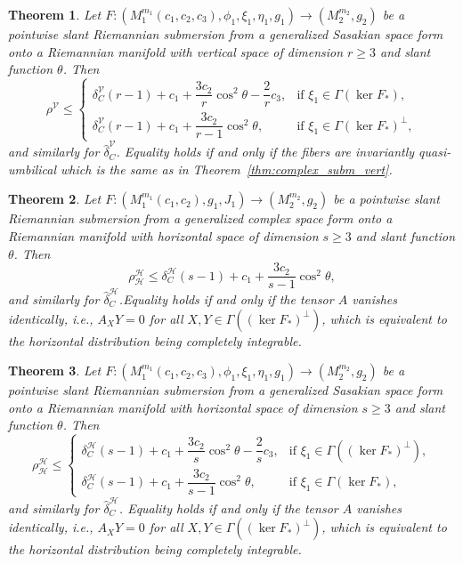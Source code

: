 \documentclass[10pt,a4paper]{amsart}
\newtheorem{theorem}{Theorem}
\newcommand{\calH}{\mathcal{H}}
\newcommand{\calV}{\mathcal{V}}
\begin{document}
\begin{theorem}\label{thm:sasakian_subm_vert}
Let $F:(M_1^{m_1}(c_1,c_2,c_3),\phi_1,\xi_1,\eta_1,g_1)\to (M_2^{m_2},g_2)$ be a pointwise slant Riemannian submersion from a generalized Sasakian space form onto a Riemannian manifold with vertical space of dimension $r\ge 3$ and slant function $\theta$. Then
\begin{equation}\label{eq:sasakian_subm_vert}
\rho^{\calV} \le \begin{cases}
\delta_C^{\calV}(r-1) + c_1 + \dfrac{3c_2}{r}\cos^2\theta - \dfrac{2}{r}c_3, & \text{if } \xi_1 \in \Gamma(\ker F_*),\\[6pt]
\delta_C^{\calV}(r-1) + c_1 + \dfrac{3c_2}{r-1}\cos^2\theta, & \text{if } \xi_1 \in \Gamma(\ker F_*)^\perp,
\end{cases}
\end{equation}
and similarly for $\hat{\delta}_C^{\calV}$. Equality holds if and only if the fibers are invariantly quasi-umbilical 
 which is the same as in 
Theorem~\ref{thm:complex_subm_vert}.
\end{theorem}

\begin{theorem}\label{thm:complex_subm_horiz}
Let $F:(M_1^{m_1}(c_1,c_2),g_1,J_1)\to (M_2^{m_2},g_2)$ be a pointwise slant Riemannian submersion from a generalized complex space form onto a Riemannian manifold with horizontal space of dimension $s\ge 3$ and slant function $\theta$. Then
\begin{equation}\label{eq:complex_horiz}
\rho_{\calH}^{\calH} \le \delta_C^{\calH}(s-1) + c_1 + \dfrac{3c_2}{s-1}\cos^2\theta,
\end{equation}
and similarly for $\hat{\delta}_C^{\calH}$.Equality holds if and only if the tensor $A$ vanishes identically, i.e., 
$A_XY = 0$ for all $X,Y \in \Gamma((\ker F_*)^\perp)$, which is equivalent 
to the horizontal distribution being completely integrable.
\end{theorem}

\begin{theorem}\label{thm:sasakian_subm_horiz}
Let $F:(M_1^{m_1}(c_1,c_2,c_3),\phi_1,\xi_1,\eta_1,g_1)\to (M_2^{m_2},g_2)$ be a pointwise slant Riemannian submersion from a generalized Sasakian space form onto a Riemannian manifold with horizontal space of dimension $s\ge 3$ and slant function $\theta$. Then
\begin{equation}\label{eq:sasakian_horiz}
\rho_{\calH}^{\calH} \le \begin{cases}
\delta_C^{\calH}(s-1) + c_1 + \dfrac{3c_2}{s}\cos^2\theta - \dfrac{2}{s}c_3, & \text{if } \xi_1 \in \Gamma((\ker F_*)^\perp),\\[6pt]
\delta_C^{\calH}(s-1) + c_1 + \dfrac{3c_2}{s-1}\cos^2\theta, & \text{if } \xi_1 \in \Gamma(\ker F_*),
\end{cases}
\end{equation}
and similarly for $\hat{\delta}_C^{\calH}$. Equality holds if and only if the tensor $A$ vanishes identically, i.e., 
$A_XY = 0$ for all $X,Y \in \Gamma((\ker F_*)^\perp)$, which is equivalent 
to the horizontal distribution being completely integrable.
\end{theorem}
\end{document}
